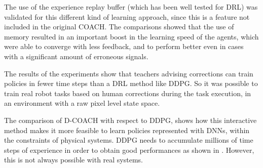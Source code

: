 The use of the experience replay buffer (which has been well tested for DRL) was validated for this different kind of learning approach, since this is a feature not included in the original COACH. The comparisons showed that the use of memory resulted in an important boost in the learning speed of the agents, which were able to converge with less feedback, and to perform better even in cases with a significant amount of erroneous signals.  

The results of the experiments show that teachers advising corrections can train policies in fewer time steps than a DRL method like DDPG. So it was possible to train real robot tasks based on human corrections during the task execution, in an environment with a raw pixel level state space. 

The comparison of D-COACH with respect to DDPG, shows how this interactive method makes it more feasible to learn policies represented with DNNs, within the constraints of physical systems. DDPG needs to accumulate millions of time steps of experience in order to obtain good performances as shown in \cite{Lillicrap2015}. However, this is not always possible with real systems.